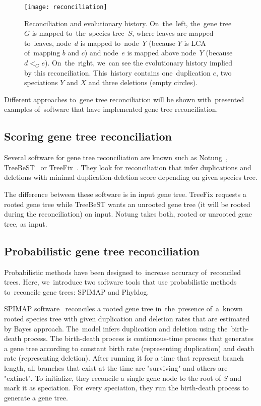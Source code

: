 \begin{figure}[h]
	\centering
	\label{reconciliation}
  	\texttt{[image: reconciliation]}
  	\caption{Reconciliation and evolutionary history. On~the~left, the~gene tree~$G$ is mapped to~the~species tree~$S$, where leaves are mapped to~leaves, node~$d$ is mapped to~node~$Y$ (because $Y$ is LCA of~mapping $b$ and $c$) and node~$e$ is mapped above node~$Y$ (because $d<_Ge$). On~the~right, we~can see the evolutionary history implied by this reconciliation. This~history contains one~duplication $e$, two speciations $Y$ and $X$ and three deletions (empty circles).}
\end{figure}

Different approaches to~gene tree reconciliation will be shown with~presented examples of~software that have implemented gene tree reconciliation. 


\subsection{Scoring gene tree reconciliation}
Several software for gene tree reconciliation are known such as 
Notung~\cite{notung}, TreeBeST~\cite{treebest} or TreeFix~\cite{treefix}. They look for reconciliation that infer duplications and deletions with minimal duplication-deletion score depending on given species tree.

The difference between these software is in input gene tree. TreeFix requests a rooted gene tree while TreeBeST wants an unrooted gene tree (it will be rooted during the reconciliation) on input. Notung takes both, rooted or unrooted gene tree, as input.

\subsection{Probabilistic gene tree reconciliation}
Probabilistic methods have been designed to~increase accuracy of~reconciled trees. Here, we~introduce two software tools that use probabilistic methods to~reconcile gene trees: SPIMAP and Phyldog.

SPIMAP software~\cite{spimap} reconciles a rooted gene tree in~the~presence of~a~known rooted species tree with given duplication and deletion rates that are estimated by Bayes approach. The~model infers duplication and deletion using the~birth-death process. The birth-death process is continuous-time process that generates a gene tree according to constant birth rate (representing duplication) and death rate (representing deletion). After running it for a time that represent branch length, all branches that exist at the time are "surviving" and others are "extinct". To initialize, they reconcile a single gene node to the root of $S$ and mark it as speciation. For every speciation, they run the birth-death process to generate a gene tree.

